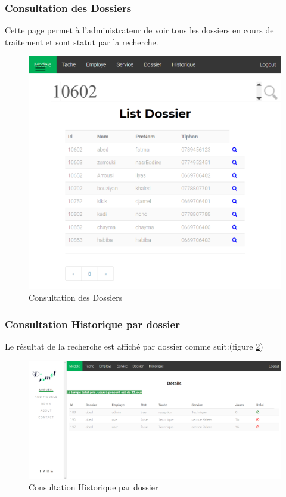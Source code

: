 \subsubsection{Consultation des  Dossiers}
Cette page permet à l'administrateur de voir tous les dossiers en cours de traitement et sont statut par la recherche.
\begin{figure}[H]
	\centering
	\includegraphics[width=0.7\linewidth]{images/captures/capturesadmin/dossier}
	\caption{Consultation des  Dossiers}
	\label{fig:dossier}
\end{figure}

\subsubsection{ Consultation Historique par dossier }
Le résultat de la recherche est affiché par dossier comme suit:(figure \ref{fig:historique})
\begin{figure}[H]
	\centering
	\includegraphics[width=1\linewidth]{images/captures/capturesadmin/historique}
	\caption{Consultation Historique par dossier }
	\label{fig:historique}
\end{figure}

